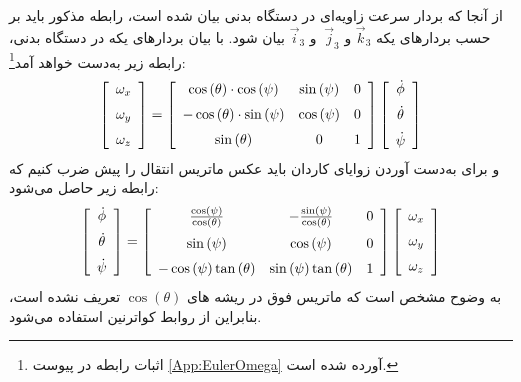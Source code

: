از آنجا که بردار سرعت زاویه‌ای در دستگاه بدنی بیان شده است، رابطه مذکور باید بر حسب بردارهای یکه $ \vec{k}_3 $ و $ \ \vec{j}_3 $ و $ \vec{i}_3 $ بیان شود. با بیان بردارهای یکه در دستگاه بدنی، رابطه زیر به‌دست خواهد آمد\footnote{اثبات رابطه در پیوست \ref{App:EulerOmega} آورده شده است.}:
\begin{equation} \label{سرعت زاویه ای و زاویه اولر}
\left[ \begin {array}{c} \omega_{{x}}\\ \noalign{\medskip}\omega_{{y}
}\\ \noalign{\medskip}\omega_{{z}}\end {array} \right] 
=
\left[ \begin {array}{ccc} \cos \left( \theta \right) \cdot \cos
 \left( \psi \right) &\sin \left( \psi \right) &0\\ \noalign{\medskip}
-\cos \left( \theta \right) \cdot \sin \left( \psi \right) &\cos
 \left( \psi \right) &0\\ \noalign{\medskip}\sin \left( \theta
 \right) &0&1\end {array} \right]
 \left[ \begin {array}{c} \dot \phi\\ \noalign{\medskip}\dot \theta
\\ \noalign{\medskip}\dot \psi\end {array} \right]
\end{equation}
و برای به‌دست آوردن زوایای کاردان باید عکس ماتریس انتقال را پیش ضرب کنیم که رابطه زیر حاصل می‌شود:
\begin{equation}
 \left[ \begin {array}{c} \dot \phi\\ \noalign{\medskip}\dot \theta
\\ \noalign{\medskip}\dot \psi\end {array} \right]=
 \left[ \begin {array}{ccc} {\frac {\cos \left( \psi \right) }{\cos
 \left( \theta \right) }}&-{\frac {\sin \left( \psi \right) }{\cos
 \left( \theta \right) }}&0\\ \noalign{\medskip}\sin \left( \psi
 \right) &\cos \left( \psi \right) &0\\ \noalign{\medskip}-\cos
 \left( \psi \right) \tan \left( \theta \right) &\sin \left( \psi
 \right) \tan \left( \theta \right) &1\end {array} \right]\left[ \begin {array}{c} \omega_{{x}}\\ \noalign{\medskip}\omega_{{y}
}\\ \noalign{\medskip}\omega_{{z}}\end {array} \right]
\end{equation}
به وضوح مشخص است که ماتریس فوق در ریشه های $\cos \left( \theta \right)$ تعریف نشده است، بنابراین از روابط کواترنین استفاده می‌شود.
